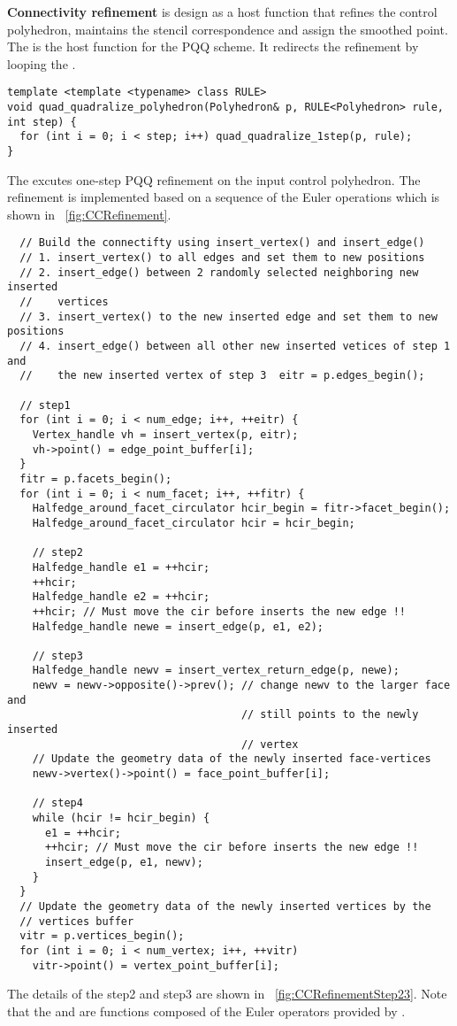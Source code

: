 \noindent \textbf{Connectivity refinement} is 
design as a host function that refines the control polyhedron,
maintains the stencil correspondence and assign the smoothed
point. The  is the host
function for the PQQ scheme. It redirects 
the refinement by looping the .
\begin{lstlisting}
template <template <typename> class RULE>
void quad_quadralize_polyhedron(Polyhedron& p, RULE<Polyhedron> rule, int step) {
  for (int i = 0; i < step; i++) quad_quadralize_1step(p, rule);
}
\end{lstlisting}
The  excutes one-step PQQ refinement
on the input control polyhedron. The refinement is implemented
based on a sequence of the Euler operations which is shown 
in \figurename\ \ref{fig:CCRefinement}.
\begin{lstlisting}
  // Build the connectifty using insert_vertex() and insert_edge()
  // 1. insert_vertex() to all edges and set them to new positions
  // 2. insert_edge() between 2 randomly selected neighboring new inserted 
  //    vertices
  // 3. insert_vertex() to the new inserted edge and set them to new positions
  // 4. insert_edge() between all other new inserted vetices of step 1 and
  //    the new inserted vertex of step 3  eitr = p.edges_begin();

  // step1
  for (int i = 0; i < num_edge; i++, ++eitr) {
    Vertex_handle vh = insert_vertex(p, eitr);
    vh->point() = edge_point_buffer[i];
  }
  fitr = p.facets_begin();
  for (int i = 0; i < num_facet; i++, ++fitr) {
    Halfedge_around_facet_circulator hcir_begin = fitr->facet_begin();
    Halfedge_around_facet_circulator hcir = hcir_begin;
    
    // step2
    Halfedge_handle e1 = ++hcir;
    ++hcir; 
    Halfedge_handle e2 = ++hcir;
    ++hcir; // Must move the cir before inserts the new edge !!
    Halfedge_handle newe = insert_edge(p, e1, e2);
    
    // step3
    Halfedge_handle newv = insert_vertex_return_edge(p, newe);
    newv = newv->opposite()->prev(); // change newv to the larger face and 
                                     // still points to the newly inserted 
                                     // vertex
    // Update the geometry data of the newly inserted face-vertices
    newv->vertex()->point() = face_point_buffer[i];
   
    // step4
    while (hcir != hcir_begin) {
      e1 = ++hcir;
      ++hcir; // Must move the cir before inserts the new edge !!
      insert_edge(p, e1, newv); 
    }
  }
  // Update the geometry data of the newly inserted vertices by the 
  // vertices buffer
  vitr = p.vertices_begin();
  for (int i = 0; i < num_vertex; i++, ++vitr) 
    vitr->point() = vertex_point_buffer[i];
\end{lstlisting}
The details of the step2 and step3 are shown in 
\figurename\ \ref{fig:CCRefinementStep23}. Note that the
 and  are functions
composed of the Euler operators provided by \cgalpoly . 

